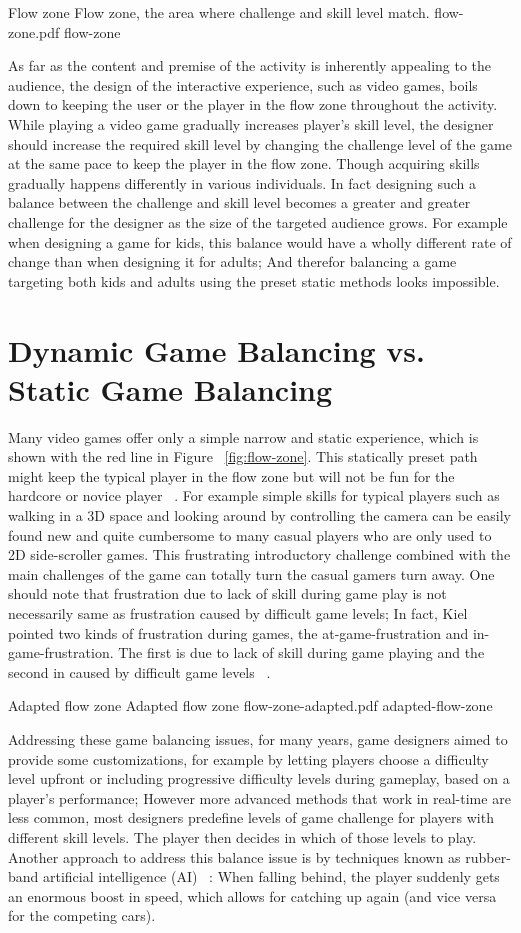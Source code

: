 \img
{Flow zone}
{Flow zone, the area where challenge and skill level match.}
{flow-zone.pdf}
{flow-zone}

As far as the content and premise of the activity is inherently appealing to the audience, the design of the interactive experience, such as video games, boils down to keeping the user or the player in the flow zone throughout the activity. While playing a video game gradually increases player's skill level, the designer should increase the required skill level by changing the challenge level of the game at the same pace to keep the player in the flow zone. Though acquiring skills gradually happens differently in various individuals. In fact designing such a balance between the challenge and skill level becomes a greater and greater challenge for the designer as the size of the targeted audience grows. For example when designing a game for kids, this balance would have a wholly different rate of change than when designing it for adults; And therefor balancing a game targeting both kids and adults using the preset static methods looks impossible.

\section{Dynamic Game Balancing vs. Static Game Balancing }
Many video games offer only a simple narrow and static experience, which is shown with the red line in Figure ~\ref{fig:flow-zone}. This statically preset path might keep the typical player in the flow zone but will not be fun for the hardcore or novice player ~\cite{chen2007flow}. For example simple skills for typical players such as walking in a 3D space and looking around by controlling the camera can be easily found new and quite cumbersome to many casual players who are only used to 2D side-scroller games. This frustrating introductory challenge combined with the main challenges of the game can totally turn the casual gamers turn away. One should note that frustration due to lack of skill during game play is not necessarily same as frustration caused by difficult game levels; In fact, Kiel pointed two kinds of frustration during games, the at-game-frustration and in-game-frustration. The first is due to lack of skill during game playing and the second in caused by difficult game levels ~\cite{gilleade2004using}.

\img
{Adapted flow zone}
{Adapted flow zone}
{flow-zone-adapted.pdf}
{adapted-flow-zone}

Addressing these game balancing issues, for many years, game designers aimed to provide some customizations, for example by letting players choose a difficulty level upfront or including progressive difficulty levels during gameplay, based on a player's performance; However more advanced methods that work in real-time are less common, most designers predefine levels of game challenge for players with different skill levels. The player then decides in which of those levels to play. Another approach to address this balance issue is by techniques known as rubber-band artificial intelligence (AI) ~\cite{champandard2003ai}: When falling behind, the player suddenly gets an enormous boost in speed, which allows for catching up again (and vice versa for the competing cars).

